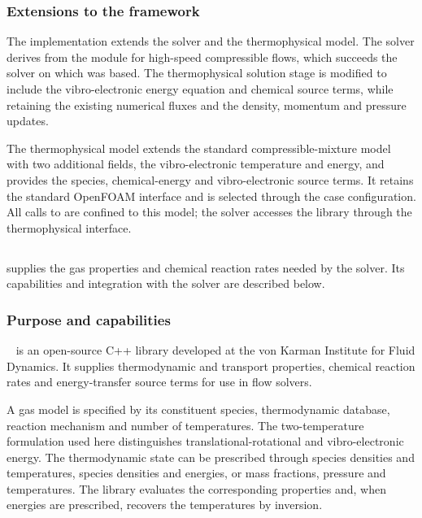 \subsubsection{Extensions to the framework}
\label{sec:openfoam-innesto}

The implementation extends the solver and the thermophysical model. The solver
derives from the module for high-speed compressible flows, which succeeds the
solver on which \hyfoam{} was based. The thermophysical solution stage is
modified to include the vibro-electronic energy equation and chemical source
terms, while retaining the existing numerical fluxes and the density,
momentum and pressure updates.

The thermophysical model extends the standard compressible-mixture model with
two additional fields, the vibro-electronic temperature and energy, and
provides the species, chemical-energy and vibro-electronic source terms. It
retains the standard OpenFOAM interface and is selected through the case
configuration. All calls to \mpp{} are confined to this model; the solver
accesses the library through the thermophysical interface.

\subsection{\mpp}
\label{sec:mutation}

\mpp{} supplies the gas properties and chemical reaction rates needed by the
solver. Its capabilities and integration with the solver are described below.

\subsubsection{Purpose and capabilities}
\label{sec:mutation-cosa}

\mpp~\cite{scoggins2020} is an open-source C++ library developed at the von
Karman Institute for Fluid Dynamics. It supplies thermodynamic and transport
properties, chemical reaction rates and energy-transfer source terms for use
in flow solvers.

A gas model is specified by its constituent species, thermodynamic database,
reaction mechanism and number of temperatures. The two-temperature
formulation used here distinguishes translational-rotational and
vibro-electronic energy. The thermodynamic state can be prescribed through
species densities and temperatures, species densities and energies, or mass
fractions, pressure and temperatures. The library evaluates the corresponding
properties and, when energies are prescribed, recovers the temperatures by
inversion.

